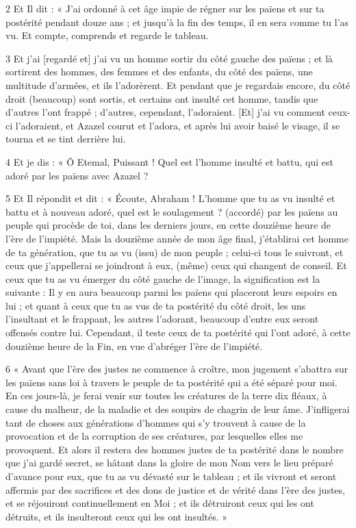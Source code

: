 \par 2 Et Il dit : « J'ai ordonné à cet âge impie de régner sur les païens et sur ta postérité pendant douze ans ; et jusqu'à la fin des temps, il en sera comme tu l'as vu. Et compte, comprends et regarde le tableau.

\par 3 Et j'ai [regardé et] j'ai vu un homme sortir du côté gauche des païens ; et là sortirent des hommes, des femmes et des enfants, du côté des païens, une multitude d'armées, et ils l'adorèrent. Et pendant que je regardais encore, du côté droit (beaucoup) sont sortis, et certains ont insulté cet homme, tandis que d'autres l'ont frappé ; d’autres, cependant, l’adoraient. [Et] j'ai vu comment ceux-ci l'adoraient, et Azazel courut et l'adora, et après lui avoir baisé le visage, il se tourna et se tint derrière lui.

\par 4 Et je dis : « Ô Etemal, Puissant ! Quel est l’homme insulté et battu, qui est adoré par les païens avec Azazel ?

\par 5 Et Il répondit et dit : « Écoute, Abraham ! L'homme que tu as vu insulté et battu et à nouveau adoré, quel est le soulagement ? (accordé) par les païens au peuple qui procède de toi, dans les derniers jours, en cette douzième heure de l'ère de l'impiété. Mais la douzième année de mon âge final, j'établirai cet homme de ta génération, que tu as vu (issu) de mon peuple ; celui-ci tous le suivront, et ceux que j'appellerai se joindront à eux, (même) ceux qui changent de conseil. Et ceux que tu as vu émerger du côté gauche de l'image, la signification est la suivante : Il y en aura beaucoup parmi les païens qui placeront leurs espoirs en lui ; et quant à ceux que tu as vus de ta postérité du côté droit, les uns l'insultant et le frappant, les autres l'adorant, beaucoup d'entre eux seront offensés contre lui. Cependant, il teste ceux de ta postérité qui l'ont adoré, à cette douzième heure de la Fin, en vue d'abréger l'ère de l'impiété.

\par 6 « Avant que l'ère des justes ne commence à croître, mon jugement s'abattra sur les païens sans loi à travers le peuple de ta postérité qui a été séparé pour moi. En ces jours-là, je ferai venir sur toutes les créatures de la terre dix fléaux, à cause du malheur, de la maladie et des soupirs de chagrin de leur âme. J'infligerai tant de choses aux générations d'hommes qui s'y trouvent à cause de la provocation et de la corruption de ses créatures, par lesquelles elles me provoquent. Et alors il restera des hommes justes de ta postérité dans le nombre que j'ai gardé secret, se hâtant dans la gloire de mon Nom vers le lieu préparé d'avance pour eux, que tu as vu dévasté sur le tableau ; et ils vivront et seront affermis par des sacrifices et des dons de justice et de vérité dans l'ère des justes, et se réjouiront continuellement en Moi ; et ils détruiront ceux qui les ont détruits, et ils insulteront ceux qui les ont insultés. »

